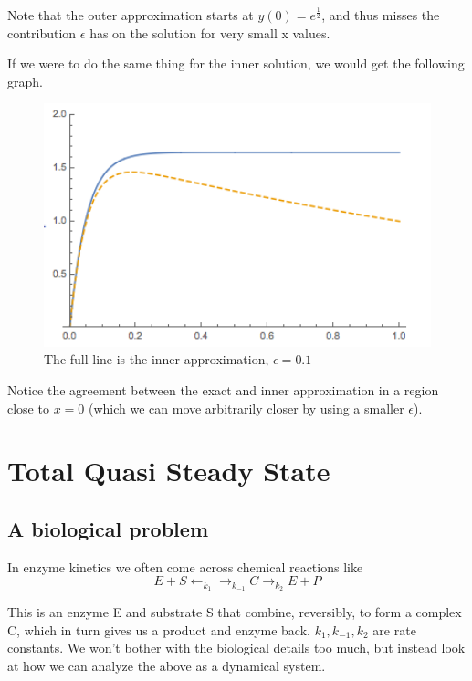 \documentclass[12pt]{article}
\begin{document}
Note that the outer approximation starts at $y(0)=e^{\frac{1}{2}}$,
and thus misses the contribution $\epsilon$ has on the solution for
very small x values.

If we were to do the same thing for the inner solution, we would get
the following graph.
\begin{figure}[ht!]
\centering
\includegraphics[width=120mm]
{tmp_ode-inner.png}
\caption{The full line is the inner approximation, $\epsilon=0.1$}
\label{overflow}
\end{figure}

Notice the agreement between the exact and inner approximation in a
region close to $x=0$ (which we can move arbitrarily closer by using a
smaller $\epsilon$).

\section{Total Quasi Steady State}

\subsection{A biological problem}

In enzyme kinetics we often come across chemical reactions like
\begin{equation}
E + S \leftarrow_{k_1} \rightarrow_{k_{-1}} C \rightarrow_{k_2} E + P
\end{equation}

This is an enzyme E and substrate S that combine, reversibly, to form a complex
C, which in turn gives us a product and enzyme back. $k_1, k_{-1}, k_2$ are rate
constants. We won't bother with the biological details too much, but instead look
at how we can analyze the above as a dynamical system.
\end{document}
